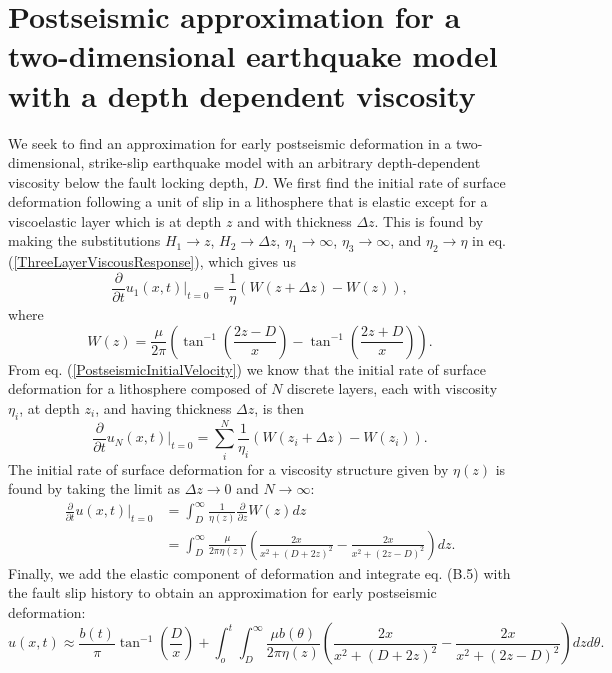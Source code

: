 \documentclass[extra,mreferee]{gji}
\begin{document}
\section{Postseismic approximation for a two-dimensional earthquake model with a depth dependent viscosity}
We seek to find an approximation for early postseismic deformation in
a two-dimensional, strike-slip earthquake model with an arbitrary
depth-dependent viscosity below the fault locking depth, $D$.  We
first find the initial rate of surface deformation following a unit of
slip in a lithosphere that is elastic except for a viscoelastic layer
which is at depth $z$ and with thickness $\Delta z$. This is found by
making the substitutions $H_1 \to z$, $H_2 \to \Delta z$, $\eta_1 \to
\infty$, $\eta_3 \to \infty$, and $\eta_2 \to \eta$ in
eq. (\ref{ThreeLayerViscousResponse}), which gives us
\begin{equation}
  \frac{\partial}{\partial t}u_1(x,t)\big|_{t=0} = 
  \frac{1}{\eta}(W(z+\Delta z) - W(z)),
\end{equation}
where
\begin{equation}
  W(z) = \frac{\mu}{2\pi}\left(\tan^{-1}\left(\frac{2z-D}{x}\right) -
  \tan^{-1}\left(\frac{2z+D}{x}\right)\right).
\end{equation}
From eq. (\ref{PostseismicInitialVelocity}) we know that the initial
rate of surface deformation for a lithosphere composed of $N$ discrete
layers, each with viscosity $\eta_i$, at depth $z_i$, and having
thickness $\Delta z$, is then
\begin{equation}
  \frac{\partial}{\partial t}u_N(x,t)\big|_{t=0} = \sum_i^N
  \frac{1}{\eta_i}(W(z_i + \Delta z) - W(z_i)).
\end{equation}
The initial rate of surface deformation for a viscosity structure
given by $\eta(z)$ is found by taking the limit as $\Delta z \to 0$
and $N \to \infty$:
\begin{align}\label{ArbitraryViscousResponse}
 \frac{\partial}{\partial t}u(x,t)\big|_{t=0} &= \int_D^\infty
 \frac{1}{\eta(z)}\frac{\partial}{\partial z} W(z) dz\\
 &= \int_D^{\infty}\frac{\mu}{2\pi\eta(z)}\left(\frac{2x}{x^2 + \left(D + 2z\right)^2} -
                     \frac{2x}{x^2 + \left(2z - D\right)^2}\right) dz.
\end{align}
Finally, we add the elastic component of deformation and integrate
eq. (B.5) with the fault slip history to obtain
an approximation for early postseismic deformation:
\begin{equation}
u(x,t) \approx \frac{b(t)}{\pi}\tan^{-1}(\frac{D}{x}) + 
               \int_o^t\int_D^\infty \frac{\mu b(\theta)}{2\pi\eta(z)}
                                    \left(\frac{2x}{x^2 + \left(D + 2z\right)^2} - 
                                    \frac{2x}{x^2 + \left(2z - D\right)^2}\right)
                                    dz d\theta.
\end{equation}
\end{document}
